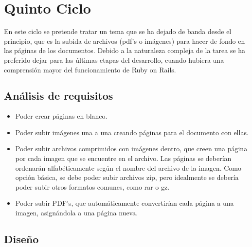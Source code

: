 \section{Quinto Ciclo} %
\label{sec:quinto_ciclo}

En este ciclo se pretende tratar un tema que se ha dejado de banda desde el principio, que es la subida de archivos (pdf's o imágenes) para hacer de fondo en las páginas de los documentos. Debido a la naturaleza compleja de la tarea se ha preferido dejar para las últimas etapas del desarrollo, cuando hubiera una comprensión mayor del funcionamiento de Ruby on Rails.

\subsection{Análisis de requisitos} %
\label{sub:análisis_de_requisitos}

\begin{itemize}
  \item Poder crear páginas en blanco.
  \item Poder subir imágenes una a una creando páginas para el documento con ellas.
  \item Poder subir archivos comprimidos con imágenes dentro, que creen una página por cada imagen que se encuentre en el archivo. Las páginas se deberían ordenarán alfabéticamente según el nombre del archivo de la imagen. Como opción básica, se debe poder subir archivos zip, pero idealmente se debería poder subir otros formatos comunes, como rar o gz.
  \item Poder subir PDF's, que automáticamente convertirían cada página a una imagen, asignándola a una página nueva.
\end{itemize}


\subsection{Diseño} %
\label{sub:diseño}

